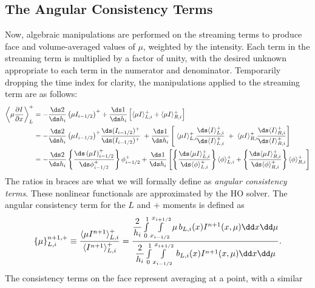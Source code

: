 \subsection{The Angular Consistency Terms}

Now, algebraic manipulations are performed on the streaming terms to produce face and
volume-averaged values of $\mu$, weighted by the intensity.  Each term in the streaming
term is multiplied by a factor of unity, with the desired unknown appropriate to each term
in the numerator and denominator.  Temporarily dropping the time
index for clarity, the manipulations applied to
the streaming term are as follows:
    \begin{align} \label{eq:line1}
        {\displaystyle \left \langle \mu \pderiv{I}{x} \right \rangle_L^+ } & = 
        -\frac{\ds2}{\ds h_i} \left(\mu I_{i-1/2}\right)^+ + \frac{\ds 1}{\ds h_i}\left[
    \mom{\mu I}_{L,i}^+ + \mom{\mu I}_{R,i}^+ \right] \\
        & =  
        -\frac{\ds2}{\ds h_i} \left(\mu I_{i-1/2}\right)^+
        \! \frac{\ds(I_{i-1/2})^+}{\ds(I_{i-1/2})^+}  \;    + \frac{\ds 1}{\ds h_i}\left[ \;
        \mom{\mu I}_{L,i}^+ \! \frac{\ds\mom{I}_{L,i}^+}{\ds\mom{I}_{L,i}^+} \; + \; \mom{\mu
        I}_{R,i}^+ \! \frac{\ds\mom{I}_{R,i}^+}{\ds\mom{I}_{R,i}^+} \right] \\
        & =  -\frac{\ds2}{\ds h_i} \left\{ {\frac{\ds \left( \mu I
            \right)^+_{i-1/2} }{\ds\phi^+_{i-1/2}}} \right\}
            \phi^+_{i-1/2} + \frac{\ds 1}{\ds h_i} \left[ \left\{ {\frac{\ds\mom{\mu
        I}_{L,i}^+}{\ds\mom{\phi}_{L,i}^+}} \right \} \mom{\phi}_{L,i}^+  +
        \left\{ {\frac{\ds\mom{\mu I}_{R,i}^+}{\ds\mom{\phi}_{R,i}^+}} \right\}
    \mom{\phi}_{R,i}^+ \right]
    \end{align}
The ratios in braces are what we will formally define as \emph{angular consistency terms}.
These nonlinear functionals are approximated by the HO solver.  The angular consistency
term for the $L$ and $+$ moments is defined as
\begin{equation}\label{eq:ang_cons_vol}
    \cur{{\mu}}_{L,i}^{n+1,+} \equiv \frac{\mom{\mu I^{n+1}}_{L,i}^+}{\mom{I^{n+1}}_{L,i}^+} =  \frac{
{\displaystyle \frac{2}{h_i}} \int\limits_0^1 \int\limits_\xl^\xr \mu \, b_{L,i}(x)
I^{n+1}(x,\mu) \dd x \dd \mu } 
{{\displaystyle \frac{2}{h_i}} \int\limits_0^1 \int\limits_\xl^\xr \, b_{L,i}(x)
I^{n+1}(x,\mu) \dd x \dd \mu } .
\end{equation}
The consistency terms on the face represent averaging at a point, with a similar
